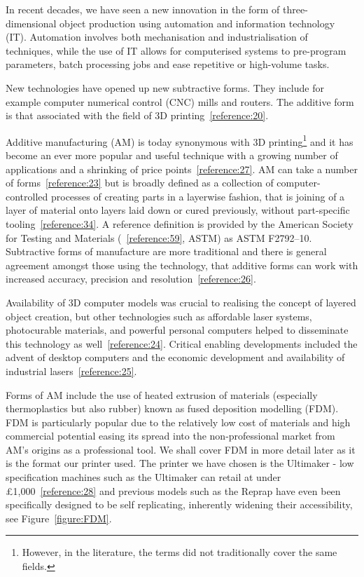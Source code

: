 \documentclass[11pt]{article} %
\begin{document}
In recent decades, we have seen a new innovation in the form of three-dimensional object production using automation and information technology (IT). Automation involves both mechanisation and industrialisation of techniques, while the use of IT allows for computerised systems to pre-program parameters, batch processing jobs and ease repetitive or high-volume tasks.

New technologies have opened up new subtractive forms. They include for example computer numerical control (CNC) mills and routers. The additive form is that associated with the field of 3D printing~\ref{reference:20}. 

Additive manufacturing (AM) is today synonymous with 3D printing\footnote{However, in the literature, the terms did not traditionally cover the same fields.} and it has become an ever more popular and useful technique with a growing number of applications and a shrinking of price points~\ref{reference:27}. AM can take a number of forms~\ref{reference:23} but is broadly defined as a collection of computer-controlled processes of creating parts in a layerwise fashion, that is joining of a layer of material onto layers laid down or cured previously, without part-specific tooling~\ref{reference:34}. A reference definition is provided by the American Society for Testing and Materials (~\ref{reference:59}, ASTM) as ASTM F2792–10. Subtractive forms of manufacture are more traditional and there is general agreement amongst those using the technology, that additive forms can work with increased accuracy, precision and resolution~\ref{reference:26}.

Availability of 3D computer models was crucial to realising the concept of layered object creation, but other technologies such as affordable laser systems, photocurable materials, and powerful personal computers helped to disseminate this technology as well~\ref{reference:24}. Critical enabling developments included the advent of desktop computers and the economic development and availability of industrial lasers~\ref{reference:25}.

Forms of AM include the use of heated extrusion of materials (especially thermoplastics but also rubber) known as fused deposition modelling (FDM). FDM is particularly popular due to the relatively low cost of materials and high commercial potential easing its spread into the non-professional market from AM's origins as a professional tool. We shall cover FDM in more detail later as it is the format our printer used. The printer we have chosen is the Ultimaker - low specification machines such as the Ultimaker can retail at under £1,000~\ref{reference:28} and previous models such as the Reprap have even been specifically designed to be self replicating, inherently widening their accessibility, see Figure~\ref{figure:FDM}.
\end{document}
